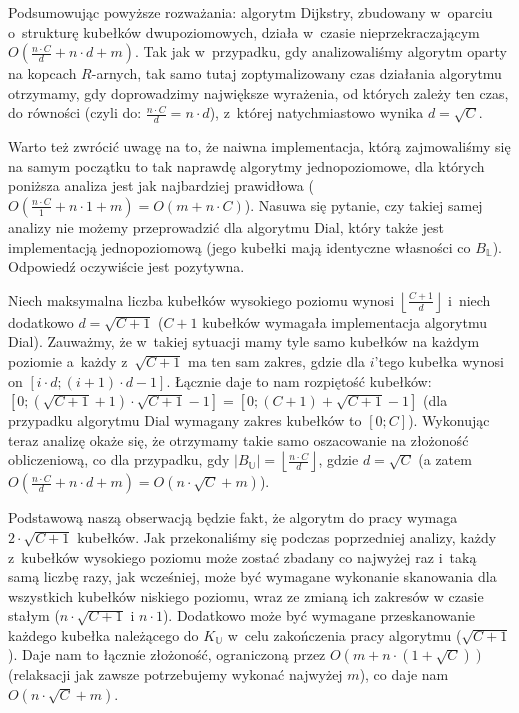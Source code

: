 Podsumowując powyższe rozważania: algorytm Dijkstry, zbudowany w~oparciu o~strukturę kubełków dwupoziomowych, działa w~czasie nieprzekraczającym $ O \left( \frac{n \cdot C}{d} + n \cdot d + m \right)$. Tak jak w~przypadku, gdy analizowaliśmy algorytm oparty na kopcach $R$-arnych, tak samo tutaj zoptymalizowany czas działania algorytmu otrzymamy, gdy doprowadzimy największe wyrażenia, od których zależy ten czas, do równości (czyli do: $\frac{n \cdot C}{d} = n \cdot d$), z~której natychmiastowo wynika $d = \sqrt{C}$.

Warto też zwrócić uwagę na to, że naiwna implementacja, którą zajmowaliśmy się na samym początku to tak naprawdę algorytmy jednopoziomowe, dla których poniższa analiza jest jak najbardziej prawidłowa ($ O \left( \frac{n \cdot C}{1} + n \cdot 1 + m \right) = O \left( m + n \cdot C \right)$). Nasuwa się pytanie, czy takiej samej analizy nie możemy przeprowadzić dla algorytmu Dial, który także jest implementacją jednopoziomową (jego kubełki mają identyczne własności co $B_{\mathbb{L}}$). Odpowiedź oczywiście jest pozytywna.

Niech maksymalna liczba kubełków wysokiego poziomu wynosi $\left \lfloor \frac{C+1}{d} \right \rfloor$ i~niech dodatkowo $d = \sqrt{C + 1}$ ($C+1$ kubełków wymagała implementacja algorytmu Dial). Zauważmy, że w~takiej sytuacji mamy tyle samo kubełków na każdym poziomie a~każdy z~$ \sqrt{C + 1}$ ma ten sam zakres, gdzie dla $i$'tego kubełka wynosi on $ \left[ i \cdot d ; \left( i+1 \right) \cdot d - 1\right]$. Łącznie daje to nam rozpiętość kubełków: $ \left[ 0 ; \left( \sqrt{C + 1} +1 \right) \cdot \sqrt {C + 1} - 1\right] = \left[ 0 ; \left( C + 1 \right) + \sqrt{C + 1} - 1 \right] $ (dla przypadku algorytmu Dial wymagany zakres kubełków to $ \left[ 0 ; C \right]$). Wykonując teraz analizę okaże się, że otrzymamy takie samo oszacowanie na złożoność obliczeniową, co dla przypadku, gdy $ \left| B_{\mathbb{U}} \right| = \left \lfloor \frac{n \cdot C}{d} \right \rfloor $, gdzie $d = \sqrt{C}$ (a zatem $ O \left( \frac{n \cdot C}{d} + n \cdot d + m \right) =  O \left( n \cdot \sqrt{C} + m \right)$).

Podstawową naszą obserwacją będzie fakt, że algorytm do pracy wymaga $ 2 \cdot \sqrt{C+1}$ kubełków. Jak przekonaliśmy się podczas poprzedniej analizy, każdy z~kubełków wysokiego poziomu może zostać zbadany co najwyżej raz i~taką samą liczbę razy, jak wcześniej, może być wymagane wykonanie skanowania dla wszystkich kubełków niskiego poziomu, wraz ze zmianą ich zakresów w czasie stałym ($n \cdot \sqrt{C+1}$ i $n \cdot 1$). Dodatkowo może być wymagane przeskanowanie każdego kubełka należącego do $K_{\mathbb{U}}$ w~celu zakończenia pracy algorytmu ($ \sqrt{C+1}$). Daje nam to łącznie złożoność, ograniczoną przez $ O \left( m + n \cdot \left( 1 + \sqrt{C} \right) \right)$ (relaksacji jak zawsze potrzebujemy wykonać najwyżej $m$), co daje nam $O \left( n \cdot \sqrt{C} + m \right)$.

